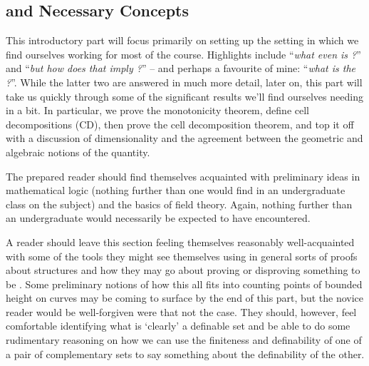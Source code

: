 % 
%
%

\begin{partbacktext}
\part{\Omy and Necessary Concepts}
\noindent This introductory part will focus primarily on setting up the setting in which we find ourselves working for most of the course. Highlights include ``\emph{what even is \omy?}'' and ``\emph{but how does that imply \pw?}'' -- and perhaps a favourite of mine: ``\emph{what is the \pwt?}''. While the latter two are answered in much more detail, later on, this part will take us quickly through some of the significant results we'll find ourselves needing in a bit. In particular, we prove the monotonicity theorem, define cell decompositions (CD), then prove the cell decomposition theorem, and top it off with a discussion of dimensionality and the agreement between the geometric and algebraic notions of the quantity.

The prepared reader should find themselves acquainted with preliminary ideas in mathematical logic (nothing further than one would find in an undergraduate class on the subject) and the basics of field theory. Again, nothing further than an undergraduate would necessarily be expected to have encountered.

A reader should leave this section feeling themselves reasonably well-acquainted with some of the tools they might see themselves using in general sorts of proofs about \om structures and how they may go about proving or disproving something to be \om. Some preliminary notions of how this all fits into counting points of bounded height on curves may be coming to surface by the end of this part, but the novice reader would be well-forgiven were that not the case. They should, however, feel comfortable identifying what is `clearly' a definable set and be able to do some rudimentary reasoning on how we can use the finiteness and definability of one of a pair of complementary sets to say something about the definability of the other.

\end{partbacktext}
